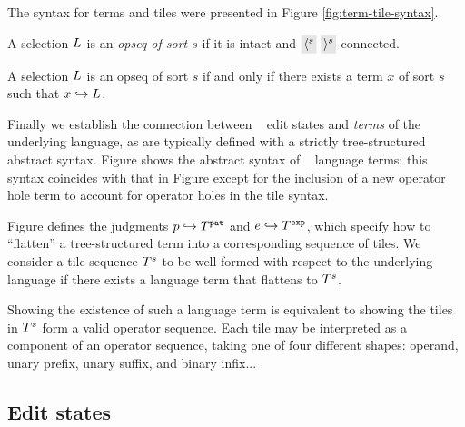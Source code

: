 The syntax for terms and tiles were presented in
Figure \ref{fig:term-tile-syntax}.



% 


\begin{definition}
  A selection $L$ is an \emph{opseq of sort $s$} if
  it is intact and $\lltip{s}~\rrtip{s}$-connected.
\end{definition}

\begin{theorem}
  A selection $L$ is an opseq of sort $s$
  if and only if there exists a term $x$ of sort $s$ such that
  $x\hookrightarrow L$.
\end{theorem}

Finally we establish the connection between
\ty~ edit states and \emph{terms} of the
underlying language, as are typically defined
with a strictly tree-structured abstract syntax.
Figure  shows the abstract syntax of
\ty~ language terms;
this syntax coincides with that in Figure 
except for the inclusion of a new operator hole term
to account for operator holes in the tile syntax.

Figure  defines the judgments
$p\hookrightarrow T^{\texttt{pat}}$
and
$e\hookrightarrow T^{\texttt{exp}}$,
which specify how to ``flatten'' a tree-structured
term into a corresponding sequence of tiles.
We consider a tile sequence $T^s$ to be well-formed
with respect to the underlying language if there exists
a language term that flattens to $T^s$.

Showing the existence of such a language term
is equivalent to showing the tiles in $T^s$
form a valid operator sequence.
Each tile may be interpreted as a component
of an operator sequence, taking one of four
different shapes: operand, unary prefix,
unary suffix, and binary infix...



\subsection{Edit states} \label{sec:edit-states}


